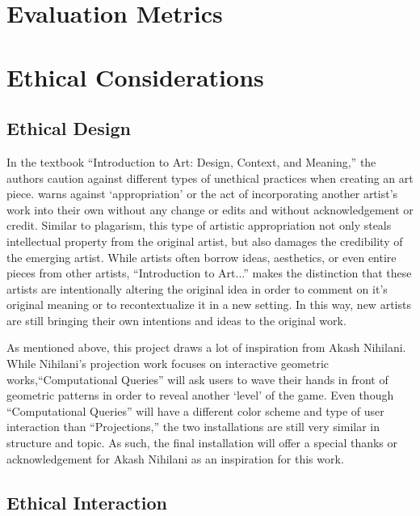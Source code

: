 \documentclass[10pt,twocolumn]{article}
\begin{document}
\section{Evaluation Metrics}

\section{Ethical Considerations}

\subsection{Ethical Design}\label{sec:design}

In the textbook ``Introduction to Art: Design, Context, and Meaning,'' \cite{blood_introduction_nodate}the authors caution against different types of unethical practices when creating an art piece. \citeauthor{blood_introduction_nodate} warns against `appropriation' or the act of incorporating another artist's work into their own without any change or edits and without acknowledgement or credit. Similar to plagarism, this type of artistic appropriation not only steals intellectual property from the original artist, but also damages the credibility of the emerging artist.  While artists often borrow ideas, aesthetics, or even entire pieces from other artists, ``Introduction to Art...'' makes the distinction that these artists are intentionally altering the original idea in order to comment on it's original meaning or to recontextualize it in a new setting. In this way, new artists are still bringing their own intentions and ideas to the original work.  

As mentioned above, this project draws a lot of inspiration from Akash Nihilani.  While Nihilani's projection work focuses on interactive geometric works,``Computational Queries'' will ask users to wave their hands in front of geometric patterns in order to reveal another `level' of the game.  Even though ``Computational Queries'' will have a different color scheme and type of user interaction than ``Projections,'' the two installations are still very similar in structure and topic.  As such, the final installation will offer a special thanks or acknowledgement for Akash Nihilani as an inspiration for this work. 

\subsection{Ethical Interaction}\label{sec:interaction}
\end{document}
